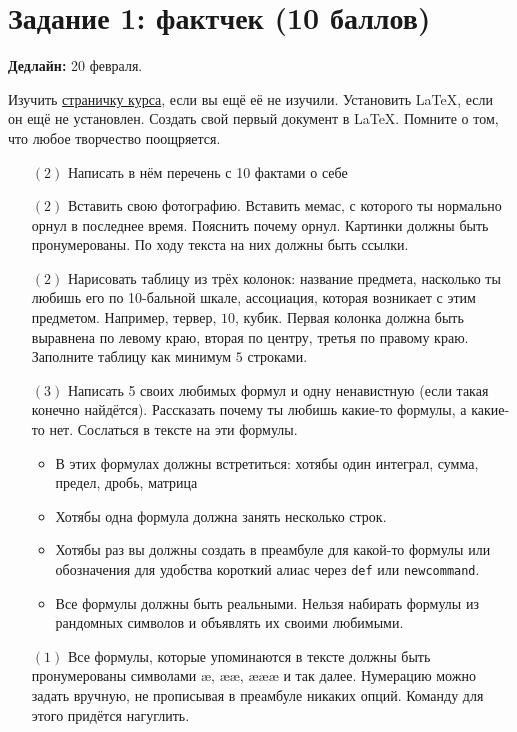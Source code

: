 \documentclass[12pt, a4paper, oneside]{article}
\begin{document}
\section*{Задание 1: фактчек  (10 баллов)}

\textbf{Дедлайн:} 20 февраля. 

Изучить \href{https://fulyankin.github.io/LaTeX/}{страничку курса}, если вы ещё её не изучили. Установить LaTeX, если он ещё не установлен. Создать свой первый документ в LaTeX. Помните о том, что любое творчество поощряется. 


\begin{itemize}

\item [$(2)$] Написать в нём перечень с 10 фактами о себе

\item[$(2)$] Вставить свою фотографию.  Вставить мемас, с которого ты нормально орнул в последнее время. Пояснить почему орнул. Картинки должны быть пронумерованы. По ходу текста на них должны быть ссылки. 

\item[$(2)$] Нарисовать таблицу из трёх колонок: название предмета, насколько ты любишь его по 10-бальной шкале, ассоциация, которая возникает с этим предметом. Например, тервер, $10$, кубик. Первая колонка должна быть выравнена по левому краю, вторая по центру, третья по правому краю. Заполните таблицу как минимум $5$ строками.

\item[$(3)$] Написать 5 своих любимых формул и одну ненавистную (если такая конечно найдётся).  Рассказать почему ты любишь какие-то формулы, а какие-то нет. Сослаться в тексте на эти формулы. 

\begin{itemize}
	\item  В этих формулах должны встретиться:  хотябы один интеграл, сумма,  предел, дробь, матрица
	\item  Хотябы одна формула должна занять несколько строк. 
	\item  Хотябы раз вы должны создать в преамбуле для какой-то формулы или обозначения для удобства короткий алиас через \texttt{def} или \texttt{newcommand}.
	\item  Все формулы должны быть реальными. Нельзя набирать формулы из рандомных символов и объявлять их своими любимыми. 
\end{itemize}


\item[$(1)$] Все формулы, которые упоминаются в тексте должны быть пронумерованы символами æ, ææ, æææ и так далее. Нумерацию можно задать вручную, не прописывая в преамбуле никаких опций. Команду для этого придётся нагуглить. 
\end{itemize}
\end{document}
